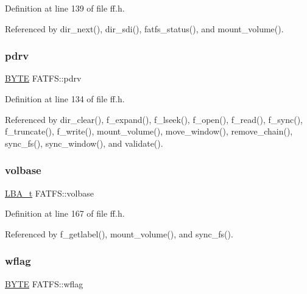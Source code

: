 Definition at line 139 of file ff.\+h.



Referenced by dir\+\_\+next(), dir\+\_\+sdi(), fatfs\+\_\+status(), and mount\+\_\+volume().

\mbox{\label{structFATFS_acae426c920cd7f59e5883f948e1b3184}} 
\subsubsection{\texorpdfstring{pdrv}{pdrv}}
{\footnotesize\ttfamily \hyperlink{ff_8h_a4ae1dab0fb4b072a66584546209e7d58}{B\+Y\+TE} F\+A\+T\+F\+S\+::pdrv}



Definition at line 134 of file ff.\+h.



Referenced by dir\+\_\+clear(), f\+\_\+expand(), f\+\_\+lseek(), f\+\_\+open(), f\+\_\+read(), f\+\_\+sync(), f\+\_\+truncate(), f\+\_\+write(), mount\+\_\+volume(), move\+\_\+window(), remove\+\_\+chain(), sync\+\_\+fs(), sync\+\_\+window(), and validate().

\mbox{\label{structFATFS_a89358c0e7b2293254c9481dcd2984d30}} 
\subsubsection{\texorpdfstring{volbase}{volbase}}
{\footnotesize\ttfamily \hyperlink{ff_8h_a1f3c30a83148a28340f009d4e583f087}{L\+B\+A\+\_\+t} F\+A\+T\+F\+S\+::volbase}



Definition at line 167 of file ff.\+h.



Referenced by f\+\_\+getlabel(), mount\+\_\+volume(), and sync\+\_\+fs().

\mbox{\label{structFATFS_a647e43c9ccae94b7274793d1909897de}} 
\subsubsection{\texorpdfstring{wflag}{wflag}}
{\footnotesize\ttfamily \hyperlink{ff_8h_a4ae1dab0fb4b072a66584546209e7d58}{B\+Y\+TE} F\+A\+T\+F\+S\+::wflag}




